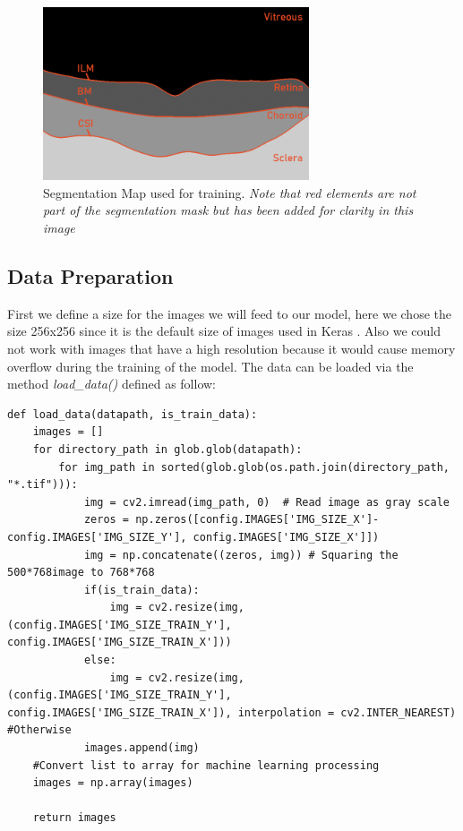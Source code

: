 \documentclass[12pt,a4paper]{scrartcl}
\begin{document}
\begin{figure}[H]
    \centering
    \includegraphics[width=0.7\textwidth]{./images/chun_w00_fix_14_segmented_annotated.png}
    \caption{Segmentation Map used for training. \emph{Note that red elements are not part of the segmentation mask but has been added for clarity in this image}}
    \label{fig:annotated-layers}
\end{figure}

\subsection{Data Preparation}\label{ss:datapreparation}
First we define a size for the images we will feed to our model, here we chose the size 256x256 since it is the default size of images used in Keras \cite{chollet2015keras}. Also we could not work with images that have a high resolution because it would cause memory overflow during the training of the model. The data can be loaded via the method \emph{load\_data()} defined as follow:
\begin{lstlisting}[caption=The method to load data can be found in the \emph{helper.py} file]
def load_data(datapath, is_train_data):
    images = []
    for directory_path in glob.glob(datapath):
        for img_path in sorted(glob.glob(os.path.join(directory_path, "*.tif"))):
            img = cv2.imread(img_path, 0)  # Read image as gray scale  
            zeros = np.zeros([config.IMAGES['IMG_SIZE_X']-config.IMAGES['IMG_SIZE_Y'], config.IMAGES['IMG_SIZE_X']]) 
            img = np.concatenate((zeros, img)) # Squaring the 500*768image to 768*768
            if(is_train_data):
                img = cv2.resize(img, (config.IMAGES['IMG_SIZE_TRAIN_Y'], config.IMAGES['IMG_SIZE_TRAIN_X']))
            else:
                img = cv2.resize(img, (config.IMAGES['IMG_SIZE_TRAIN_Y'], config.IMAGES['IMG_SIZE_TRAIN_X']), interpolation = cv2.INTER_NEAREST)  #Otherwise 
            images.append(img)
    #Convert list to array for machine learning processing        
    images = np.array(images)
    
    return images
\end{lstlisting}
\end{document}
